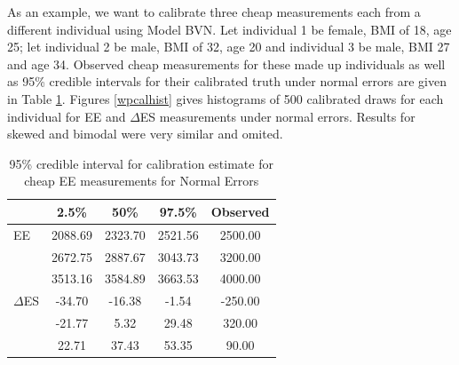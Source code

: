 \documentclass[11pt]{article}\usepackage[]{graphicx}\usepackage[]{color}
\begin{document}
As an example, we want to calibrate three cheap measurements each from a different individual using Model BVN. Let individual 1 be female, BMI of 18, age 25; let individual 2 be male, BMI of 32, age 20 and individual 3 be male, BMI 27 and age 34. Observed cheap measurements for these made up individuals as well as 95\% credible intervals for their calibrated truth under normal errors are given in Table \ref{calibratedee}. Figures \ref{wpcalhist} gives histograms of 500 calibrated draws for each individual for EE and $\Delta$ES measurements under normal errors. Results for skewed and bimodal were very similar and omited.

\begin{table}[ht]
\centering
\begin{tabular}{l|ccc|c}
  \hline
 & 2.5\% & 50\% & 97.5\% & Observed \\ 
  \hline
EE & 2088.69 & 2323.70 & 2521.56 & 2500.00 \\ 
  & 2672.75 & 2887.67 & 3043.73 & 3200.00 \\ 
  & 3513.16 & 3584.89 & 3663.53 & 4000.00 \\ 
  $\Delta$ES & -34.70 & -16.38 & -1.54 & -250.00 \\ 
  & -21.77 & 5.32 & 29.48 & 320.00 \\ 
  & 22.71 & 37.43 & 53.35 & 90.00 \\ 
   \hline
\end{tabular}
\caption{95\% credible interval for calibration estimate for cheap EE measurements for Normal Errors} 
\label{calibratedee}
\end{table}
\end{document}
